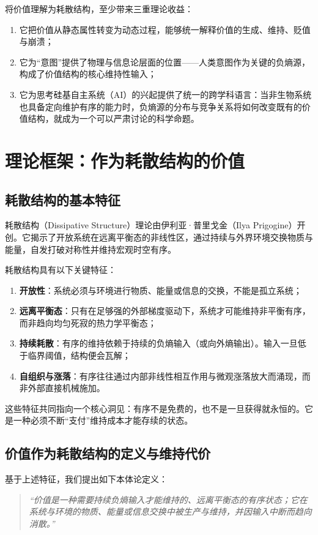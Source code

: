 \documentclass[11pt,a4paper]{ctexart}
\begin{document}
将价值理解为耗散结构，至少带来三重理论收益：
\begin{enumerate}
    \item 它把价值从静态属性转变为动态过程，能够统一解释价值的生成、维持、贬值与崩溃；
    \item 它为“意图”提供了物理与信息论层面的位置——人类意图作为关键的负熵源，构成了价值结构的核心维持性输入；
    \item 它为思考硅基自主系统（AI）的兴起提供了统一的跨学科语言：当非生物系统也具备定向维护有序的能力时，负熵源的分布与竞争关系将如何改变既有的价值结构，就成为一个可以严肃讨论的科学命题。
\end{enumerate}

\section{理论框架：作为耗散结构的价值}

\subsection{耗散结构的基本特征}
耗散结构（Dissipative Structure）理论由伊利亚·普里戈金（Ilya Prigogine）开创\cite{prigogine1977self, prigogine1978time, prigogine1984order}。它揭示了开放系统在远离平衡态的非线性区，通过持续与外界环境交换物质与能量，自发打破对称性并维持宏观时空有序。

耗散结构具有以下关键特征：
\begin{enumerate}
    \item \textbf{开放性}：系统必须与环境进行物质、能量或信息的交换，不能是孤立系统；
    \item \textbf{远离平衡态}：只有在足够强的外部梯度驱动下，系统才可能维持非平衡有序，而非趋向均匀死寂的热力学平衡态；
    \item \textbf{持续耗散}：有序的维持依赖于持续的负熵输入（或向外熵输出）。输入一旦低于临界阈值，结构便会瓦解；
    \item \textbf{自组织与涨落}：有序往往通过内部非线性相互作用与微观涨落放大而涌现，而非外部直接机械施加。
\end{enumerate}

这些特征共同指向一个核心洞见：有序不是免费的，也不是一旦获得就永恒的。它是一种必须不断“支付”维持成本才能存续的状态。

\subsection{价值作为耗散结构的定义与维持代价}
基于上述特征，我们提出如下本体论定义：
\begin{quote}
\textit{“价值是一种需要持续负熵输入才能维持的、远离平衡态的有序状态；它在系统与环境的物质、能量或信息交换中被生产与维持，并因输入中断而趋向消散。”}
\end{quote}
\end{document}
